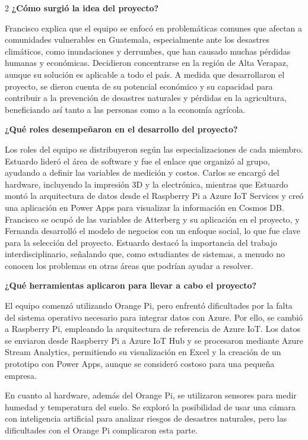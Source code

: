 \documentclass[12pt,spanish,Letterpaper,openany]{book}
\begin{document}
\begin {multicols}{2}
\textbf{¿Cómo surgió la idea del proyecto?}

Francisco explica que el equipo se enfocó en problemáticas comunes que afectan a comunidades vulnerables en Guatemala, especialmente ante los desastres climáticos, como inundaciones y derrumbes, que han causado muchas pérdidas humanas y económicas. Decidieron concentrarse en la región de Alta Verapaz, aunque su solución es aplicable a todo el país. A medida que desarrollaron el proyecto, se dieron cuenta de su potencial económico y su capacidad para contribuir a la prevención de desastres naturales y pérdidas en la agricultura, beneficiando así tanto a las personas como a la economía agrícola.

\textbf{¿Qué roles desempeñaron en el desarrollo del proyecto?}

Los roles del equipo se distribuyeron según las especializaciones de cada miembro. Estuardo lideró el área de software y fue el enlace que organizó al grupo, ayudando a definir las variables de medición y costos. Carlos se encargó del hardware, incluyendo la impresión 3D y la electrónica, mientras que Estuardo montó la arquitectura de datos desde el Raspberry Pi a Azure IoT Services y creó una aplicación en Power Apps para visualizar la información en Cosmos DB. Francisco se ocupó de las variables de Atterberg y su aplicación en el proyecto, y Fernanda desarrolló el modelo de negocios con un enfoque social, lo que fue clave para la selección del proyecto. Estuardo destacó la importancia del trabajo interdisciplinario, señalando que, como estudiantes de sistemas, a menudo no conocen los problemas en otras áreas que podrían ayudar a resolver.

\textbf{¿Qué herramientas aplicaron para llevar a cabo el proyecto?}

El equipo comenzó utilizando Orange Pi, pero enfrentó dificultades por la falta del sistema operativo necesario para integrar datos con Azure. Por ello, se cambió a Raspberry Pi, empleando la arquitectura de referencia de Azure IoT. Los datos se enviaron desde Raspberry Pi a Azure IoT Hub y se procesaron mediante Azure Stream Analytics, permitiendo su visualización en Excel y la creación de un prototipo con Power Apps, aunque se consideró costoso para una pequeña empresa.

En cuanto al hardware, además del Orange Pi, se utilizaron sensores para medir humedad y temperatura del suelo. Se exploró la posibilidad de usar una cámara con inteligencia artificial para analizar riesgos de desastres naturales, pero las dificultades con el Orange Pi complicaron esta parte.


\end{multicols}
\end{document}
